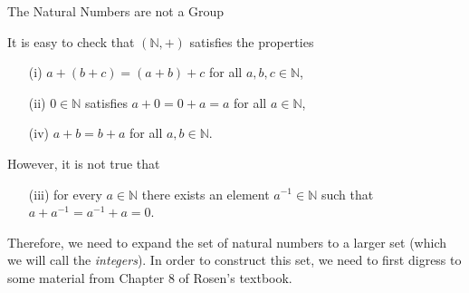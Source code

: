 \documentclass[smaller,hyperref={CJKbookmarks=true}]{beamer}
\newcommand{\N}{\mathbb{N}} \newcommand{\Z}{\mathbb{Z}} \newcommand{\Q}{\mathbb{Q}}
\begin{document}
\begin{frame}[c]{The Natural Numbers are not a Group}
\begin{spacing}{1.1}
It is easy to check that $(\N,+)$ satisfies the properties
\begin{itemize}
  \item[(i)] $a+(b+c)=(a+b)+c$ for all $a,b,c\in\N$,
  \item[(ii)] $0\in\N$ satisfies $a+0=0+a=a$ for all $a\in\N$,
  \item[(iv)] $a+b=b+a$ for all $a,b\in\N$.
\end{itemize}
However, it is not true that
\begin{itemize}
  \item[(iii)] for every $a\in\N$ there exists an element $a^{-1}\in\N$ such that $a+a^{-1}=a^{-1}+a=0$.
\end{itemize}
\vspace*{6pt}
Therefore, we need to expand the set of natural numbers to a larger set
(which we will call the \emph{integers}). In order to construct this set, we need to
first digress to some material from Chapter 8 of Rosen's textbook.
\end{spacing}
\end{frame}
\end{document}
